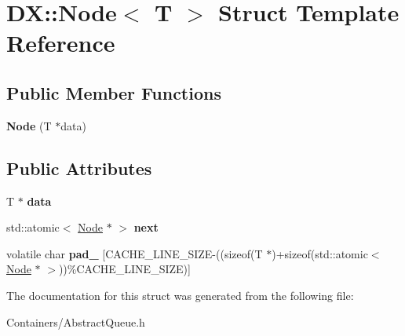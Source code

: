 \hypertarget{struct_d_x_1_1_node}{\section{D\-X\-:\-:Node$<$ T $>$ Struct Template Reference}
\label{struct_d_x_1_1_node}
}
\subsection*{Public Member Functions}
\begin{DoxyCompactItemize}
\item 
\hypertarget{struct_d_x_1_1_node_a56b09396836fae506175343de2e924ce}{{\bfseries Node} (T $\ast$data)}\label{struct_d_x_1_1_node_a56b09396836fae506175343de2e924ce}

\end{DoxyCompactItemize}
\subsection*{Public Attributes}
\begin{DoxyCompactItemize}
\item 
\hypertarget{struct_d_x_1_1_node_ae52ee669616a0e9dd2f01a687931ca05}{T $\ast$ {\bfseries data}}\label{struct_d_x_1_1_node_ae52ee669616a0e9dd2f01a687931ca05}

\item 
\hypertarget{struct_d_x_1_1_node_a8b9580e73f0f9325898e19bbe36c3dd3}{std\-::atomic$<$ \hyperlink{struct_d_x_1_1_node}{Node} $\ast$ $>$ {\bfseries next}}\label{struct_d_x_1_1_node_a8b9580e73f0f9325898e19bbe36c3dd3}

\item 
\hypertarget{struct_d_x_1_1_node_a6d1d2ba6bff1f20f955c1e8d19212f89}{volatile char {\bfseries pad\-\_\-} \mbox{[}C\-A\-C\-H\-E\-\_\-\-L\-I\-N\-E\-\_\-\-S\-I\-Z\-E-\/((sizeof(T $\ast$)+sizeof(std\-::atomic$<$ \hyperlink{struct_d_x_1_1_node}{Node} $\ast$ $>$))\%C\-A\-C\-H\-E\-\_\-\-L\-I\-N\-E\-\_\-\-S\-I\-Z\-E)\mbox{]}}\label{struct_d_x_1_1_node_a6d1d2ba6bff1f20f955c1e8d19212f89}

\end{DoxyCompactItemize}


The documentation for this struct was generated from the following file\-:\begin{DoxyCompactItemize}
\item 
Containers/Abstract\-Queue.\-h\end{DoxyCompactItemize}
